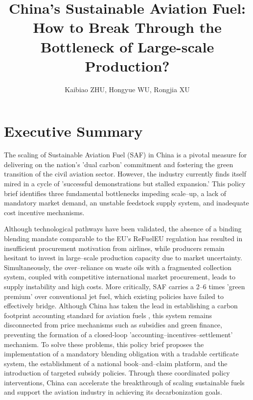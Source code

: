 \documentclass[a4paper,11pt]{article}
\title{\color{schoolblue}\textbf{China's Sustainable Aviation Fuel: How to Break Through the Bottleneck of Large-scale Production?}}
\author{Kaibiao ZHU, Hongyue WU, Rongjia XU}
\date{}
\begin{document}
\maketitle

\section*{Executive Summary}
\begin{tcolorbox}[summarystyle]

The scaling of Sustainable Aviation Fuel (SAF) in China is a pivotal measure for delivering on the nation's 'dual carbon' commitment and fostering the green transition of the civil aviation sector. However, the industry currently finds itself mired in a cycle of 'successful demonstrations but stalled expansion.' This policy brief identifies three fundamental bottlenecks impeding scale--up, a lack of mandatory market demand, an unstable feedstock supply system, and inadequate cost incentive mechanisms.

Although technological pathways have been validated, the absence of a binding blending mandate comparable to the EU's ReFuelEU regulation has resulted in insufficient procurement motivation from airlines, while producers remain hesitant to invest in large--scale production capacity due to market uncertainty. Simultaneously, the over--reliance on waste oils with a fragmented collection system, coupled with competitive international market procurement, leads to supply instability and high costs. More critically, SAF carries a 2--6 times 'green premium' over conventional jet fuel, which existing policies have failed to effectively bridge. Although China has taken the lead in establishing a carbon footprint accounting standard for aviation fuels \cite{caac2025}, this system remains disconnected from price mechanisms such as subsidies and green finance, preventing the formation of a closed-loop 'accounting--incentives--settlement' mechanism.
To solve these problems, this policy brief proposes the implementation of a mandatory blending obligation with a tradable certificate system, the establishment of a national book--and--claim platform, and the introduction of targeted subsidy policies. Through these coordinated policy interventions, China can accelerate the breakthrough of scaling sustainable fuels and support the aviation industry in achieving its decarbonization goals.
\end{tcolorbox}
\end{document}

